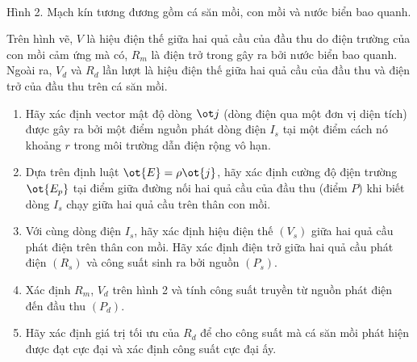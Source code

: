 \begin{vd}
\begin{center}
    \\Hình 2. Mạch kín tương đương gồm cá săn mồi, con mồi và nước biển bao quanh.
\end{center}
Trên hình vẽ, $V$ là hiệu điện thế giữa hai quả cầu của đầu thu do điện trường của con mồi cảm ứng mà có, $R_m$ là điện trở trong gây ra bởi nước biển bao quanh. Ngoài ra, $V_d$ và $R_d$ lần lượt là hiệu điện thế giữa hai quả cầu của đầu 
thu và điện trở của đầu thu trên cá săn mồi.\\
\begin{enumerate}[1)]
    \item  Hãy xác định vector mật độ dòng $\ot j$ (dòng điện qua một đơn vị diện tích) được gây ra bởi một điểm nguồn phát dòng điện $I_s$ tại một điểm cách nó khoảng $r$ trong môi trường dẫn điện rộng vô hạn. 
    \item Dựa trên định luật $\ot{E} = \rho \ot{j}$, hãy xác định cường độ địện trường $\ot{E_p}$ tại điểm giữa đường nối hai quả cầu của đầu thu (điểm $P$) khi biết dòng $I_s$ chạy giữa hai quả cầu trên thân con mồi.
    \item Với cùng dòng điện $I_s$, hãy xác định hiệu điện thế $(V_s)$ giữa hai quả cầu phát điện trên thân con mồi. Hãy xác định điện trở giữa hai quả cầu phát điện $(R_s)$ và công suất sinh ra bởi nguồn $(P_s)$.
    \item Xác định $R_m$, $V_d$ trên hình 2 và tính công suất truyền từ nguồn phát điện đến đầu thu $(P_d)$. 
    \item Hãy xác định giá trị tối ưu của $R_d$ để cho công suất mà cá săn mồi phát hiện được đạt cực đại và xác định công suất cực đại ấy.
\end{enumerate}
\end{vd}
